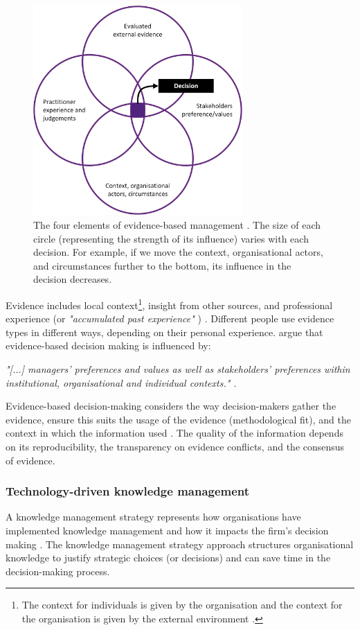 \begin{figure}[H]
\centering
  \includegraphics[width=8cm]{../../Images/DM07_Evidence.png}
  \caption{The four elements of evidence-based management \parencite{DM03}. The size of each circle (representing the strength of its influence) varies with each decision. For example, if we move the context, organisational actors, and circumstances further to the bottom, its influence in the decision decreases.}
  \label{fig:dmm01}
\end{figure}

Evidence includes local context\footnote{The context for individuals is given by the organisation and the context for the organisation is given by the external environment \parencite{DM04}.}, insight from other sources, and professional experience (or \textit{"accumulated past experience"} \parencite{PM04}) \parencite{DM03}. Different people use evidence types in different ways, depending on their personal experience. \cite{DM07} argue that evidence-based decision making is influenced by:
\begin{quoting}\itshape
"[...] managers' preferences and values as well as stakeholders' preferences within institutional, organisational and individual contexts." \parencite{DM07}.
\end{quoting}

Evidence-based decision-making considers the way decision-makers gather the evidence, ensure this suits the usage of the evidence (methodological fit), and the context in which the information used \parencite{DM07}. The quality of the information depends on its reproducibility, the transparency on evidence conflicts, and the consensus of evidence.

\subsubsection{Technology-driven knowledge management}
A knowledge management strategy represents how organisations have implemented knowledge management and how it impacts the firm's decision making \parencite{KM03}. The knowledge management strategy approach structures organisational knowledge to justify strategic choices (or decisions) and can save time in the decision-making process. 

